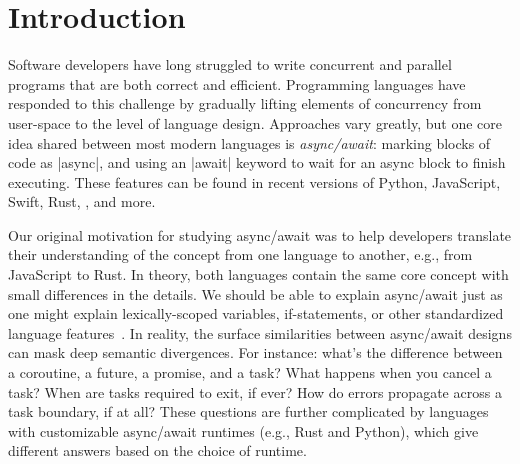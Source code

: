 \section{Introduction}

Software developers have long struggled to write concurrent and parallel programs that are both correct and efficient. Programming languages have responded to this challenge by gradually lifting elements of concurrency from user-space to the level of language design. Approaches vary greatly, but one core idea shared between most modern languages is \emph{async/await}: marking blocks of code as \code|async|, and using an \code|await| keyword to wait for an async block to finish executing. These features can be found in recent versions of Python, JavaScript, Swift, Rust, \CSharp, and more.

Our original motivation for studying async/await was to help developers translate their understanding of the concept from one language to another, e.g., from JavaScript to Rust. In theory, both languages contain the same core concept with small differences in the details. We should be able to explain async/await just as one might explain lexically-scoped variables, if-statements, or other standardized language features~\cite{lu_identifying_2024}. In reality, the surface similarities between async/await designs can mask deep semantic divergences. For instance: what's the difference between a coroutine, a future, a promise, and a task? What happens when you cancel a task? When are tasks required to exit, if ever? How do errors propagate across a task boundary, if at all? These questions are further complicated by languages with customizable async/await runtimes (e.g., Rust and Python), which give different answers based on the choice of runtime.

